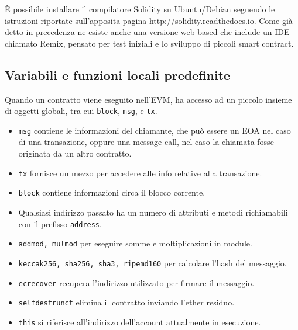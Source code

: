 \`E possibile installare il compilatore Solidity su Ubuntu/Debian seguendo le istruzioni riportate sull'apposita pagina http://solidity.readthedocs.io. Come già detto in precedenza ne esiste anche una versione web-based che include un IDE chiamato Remix, pensato per test iniziali e lo sviluppo di piccoli smart contract.

\subsection{Variabili e funzioni locali predefinite}
Quando un contratto viene eseguito nell'EVM, ha accesso ad un piccolo insieme di oggetti globali, tra cui \lstinline|block|, \lstinline|msg|, e \lstinline|tx|.
\begin{itemize}
	\item \lstinline|msg| contiene le informazioni del chiamante, che può essere un EOA nel caso di una transazione, oppure una message call, nel caso la chiamata fosse originata da un altro contratto.
	\item \lstinline|tx| fornisce un mezzo per accedere alle info relative alla transazione.
	\item \lstinline|block| contiene informazioni circa il blocco corrente.
	\item Qualsiasi indirizzo passato ha un numero di attributi e metodi richiamabili con il prefisso \lstinline|address|.
	\item \lstinline|addmod, mulmod| per eseguire somme e moltiplicazioni in module.
	\item \lstinline|keccak256, sha256, sha3, ripemd160| per calcolare l'hash del messaggio.
	\item \lstinline|ecrecover| recupera l'indirizzo utilizzato per firmare il messaggio.
	\item \lstinline|selfdestrunct| elimina il contratto inviando l'ether residuo.
	\item \lstinline|this| si riferisce all'indirizzo dell'account attualmente in esecuzione.
\end{itemize}

